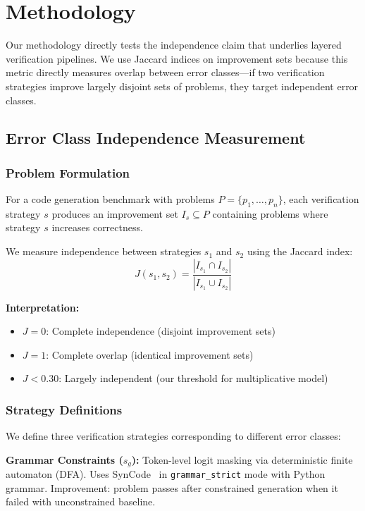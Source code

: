 \section{Methodology}
\label{sec:methodology}

Our methodology directly tests the independence claim that underlies layered verification pipelines. We use Jaccard indices on improvement sets because this metric directly measures overlap between error classes---if two verification strategies improve largely disjoint sets of problems, they target independent error classes.

\subsection{Error Class Independence Measurement}

\subsubsection{Problem Formulation}

For a code generation benchmark with problems $P = \{p_1, \ldots, p_n\}$, each verification strategy $s$ produces an improvement set $I_s \subseteq P$ containing problems where strategy $s$ increases correctness.

We measure independence between strategies $s_1$ and $s_2$ using the Jaccard index:
\begin{equation}
J(s_1, s_2) = \frac{|I_{s_1} \cap I_{s_2}|}{|I_{s_1} \cup I_{s_2}|}
\end{equation}

\textbf{Interpretation:}
\begin{itemize}
    \item $J = 0$: Complete independence (disjoint improvement sets)
    \item $J = 1$: Complete overlap (identical improvement sets)
    \item $J < 0.30$: Largely independent (our threshold for multiplicative model)
\end{itemize}

\subsubsection{Strategy Definitions}

We define three verification strategies corresponding to different error classes:

\textbf{Grammar Constraints ($s_g$):} Token-level logit masking via deterministic finite automaton (DFA). Uses SynCode~\cite{syncode2024} in \texttt{grammar\_strict} mode with Python grammar. Improvement: problem passes after constrained generation when it failed with unconstrained baseline.


